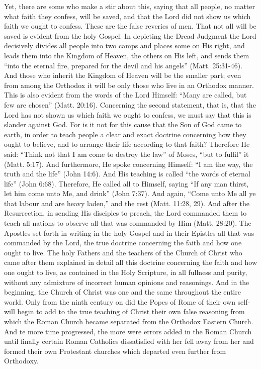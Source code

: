 Yet, there are some who make a stir about this, saying that all people, no matter what faith they confess, will be saved, and that the Lord did not show us which faith we ought to confess. These are the false reveries of men. That not all will be saved is evident from the holy Gospel. In depicting the Dread Judgment the Lord decisively divides all people into two camps and places some on His right, and leads them into the Kingdom of Heaven, the others on His left, and sends them “into the eternal fire, prepared for the devil and his angels” (Matt. 25:31-46). And those who inherit the Kingdom of Heaven will be the smaller part; even from among the Orthodox it will be only those who live in an Orthodox manner. This is also evident from the words of the Lord Himself: “Many are called, but few are chosen” (Matt. 20:16). Concerning the second statement, that is, that the Lord has not shown us which faith we ought to confess, we must say that this is slander against God. For is it not for this cause that the Son of God came to earth, in order to teach people a clear and exact doctrine concerning how they ought to believe, and to arrange their life according to that faith? Therefore He said: “Think not that I am come to destroy the law” of Moses, “but to fulfil” it (Matt. 5:17). And furthermore, He spoke concerning Himself: ``I am the way, the truth and the life'' (John 14:6). And His teaching is called ``the words of eternal life'' (John 6:68). Therefore, He called all to Himself, saying ``If any man thirst, let him come unto Me, and drink'' (John 7:37). And again, ``Come unto Me all ye that labour and are heavy laden,'' and the rest (Matt. 11:28, 29). And after the Resurrection, in sending His disciples to preach, the Lord commanded them to teach all nations to observe all that was commanded by Him (Matt. 28:20). The Apostles set forth in writing in the holy Gospel and in their Epistles all that was commanded by the Lord, the true doctrine concerning the faith and how one ought to live. The holy Fathers and the teachers of the Church of Christ who came after them explained in detail all this doctrine concerning the faith and how one ought to live, as contained in the Holy Scripture, in all fullness and purity, without any admixture of incorrect human opinions and reasonings. And in the beginning, the Church of Christ was one and the same throughout the entire world. Only from the ninth century on did the Popes of Rome of their own self-will begin to add to the true teaching of Christ their own false reasoning from which the Roman Church became separated from the Orthodox Eastern Church. And te more time progressed, the more were errors added in the Roman Church until finally certain Roman Catholics dissatisfied with her fell away from her and formed their own Protestant churches which departed even further from Orthodoxy.

